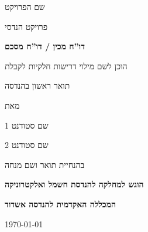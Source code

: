 \documentclass[12pt]{book}
\numberwithin{equation}{section}
\numberwithin{figure}{section}
\numberwithin{table}{section}
\begin{document}
\vspace*{0.1cm}
\begin{center}
\fontsize{16pt}{19pt}
\selectfont

{\Large   שם הפרויקט}
\vspace*{0.5cm}

{\Large פרויקט הנדסי}

\vspace*{1cm}

\fontsize{14pt}{17pt}
\selectfont

\textbf{דו''ח מכין / דו''ח מסכם}
\vspace*{1.5cm}

\fontsize{10pt}{12pt}
\selectfont

הוכן לשם מילוי דרישות חלקיות לקבלת

תואר ראשון בהנדסה 

\vspace*{1cm}

מאת

\vspace*{1cm}

\fontsize{16pt}{19pt}
\selectfont

{\Large שם סטודנט 1}

\vspace*{0.5cm}

{\Large שם סטודנט 2}

\fontsize{12pt}{12pt}
\selectfont

\vspace*{1cm}

בהנחיית תואר ושם מנחה

\vspace*{2cm}

\fontsize{14pt}{17pt}
\selectfont

\textbf{הוגש למחלקה להנדסת חשמל ואלקטרוניקה}
  
\textbf{המכללה האקדמית להנדסה אשדוד}

\vspace*{3cm}

\begin{english}\today\end{english} ~~~~~~~~~~~~~~~~~~~~~~~~~~~~~\Hebrewtoday


\end{center}

\newpage
\end{document}
